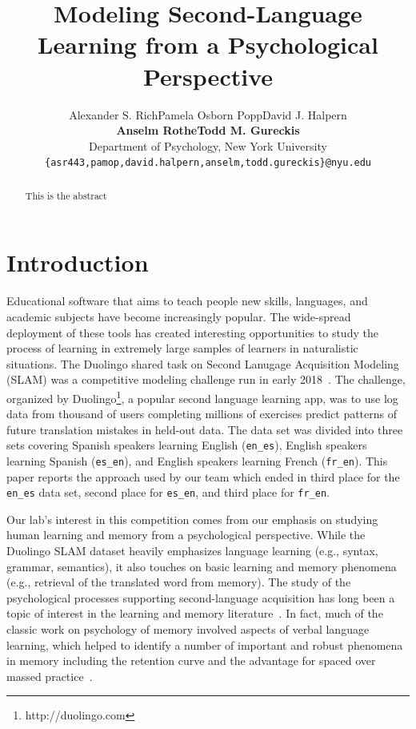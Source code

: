 \documentclass[11pt,a4paper]{article}
\title{Modeling Second-Language Learning from a Psychological Perspective}
\author{Alexander S. Rich\qquad Pamela Osborn Popp\qquad David J. Halpern\\
  \textbf{Anselm Rothe\qquad Todd M. Gureckis} \\
  Department of Psychology, New York University \\
  {\tt \{asr443,pamop,david.halpern,anselm,todd.gureckis\}@nyu.edu} \\}
\date{}
\begin{document}
\maketitle
\begin{abstract}
This is the abstract
\end{abstract}

\section{Introduction}

Educational software that aims to teach people new skills, languages, and
academic subjects have become increasingly popular.  The wide-spread
deployment of these tools has created interesting opportunities to study
the process of learning in extremely large samples of learners in naturalistic
situations. The Duolingo shared task on Second Lanugage Acquisition Modeling (SLAM)
was a competitive modeling challenge run in early 2018~\cite{slam18}.
The challenge, organized by Duolingo\footnote{http://duolingo.com}, a popular second
language learning app, was
to use log data from thousand of users completing millions of exercises 
predict patterns of future translation mistakes in held-out data.  The data set was
divided into three sets covering Spanish speakers learning English ({\tt en\_es}),
English speakers learning Spanish ({\tt es\_en}), and English speakers learning
French ({\tt fr\_en}).
This paper reports the approach used by our team which ended in third place 
for the {\tt en\_es} data set, second place for {\tt es\_en}, and third place
for {\tt fr\_en}.

Our lab's interest in this competition comes from our emphasis on studying human learning
and memory from a psychological perspective.  While the Duolingo SLAM dataset 
heavily emphasizes language learning (e.g., syntax, grammar, semantics), it also touches on
basic learning and memory phenomena (e.g., retrieval of the translated
word from memory).  The study of the psychological processes supporting second-language 
acquisition has long been a topic of interest in the learning and memory literature~\cite[e.g.,]{Atkinson:1972rm,Atkinson:1972rz,Pavlik:2008rm}.
In fact, much of the classic work on psychology of memory involved aspects of verbal
language learning, which helped to identify a number of important and robust phenomena
in memory including the retention curve and the advantage for spaced
over massed practice~\cite{Ruth:1928aa,Rubin:1996aa,Cepeda:2006aa}.
\end{document}
